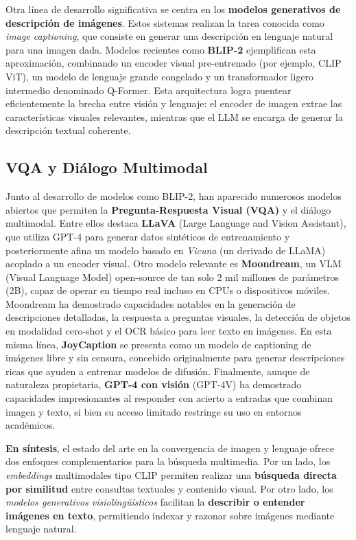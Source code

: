 Otra línea de desarrollo significativa se centra en los \textbf{modelos generativos de descripción de imágenes}. Estos sistemas realizan la tarea conocida como \emph{image captioning}, que consiste en generar una descripción en lenguaje natural para una imagen dada. Modelos recientes como \textbf{BLIP-2} ejemplifican esta aproximación, combinando un encoder visual pre-entrenado (por ejemplo, CLIP ViT), un modelo de lenguaje grande congelado y un transformador ligero intermedio denominado Q-Former. Esta arquitectura logra puentear eficientemente la brecha entre visión y lenguaje: el encoder de imagen extrae las características visuales relevantes, mientras que el LLM se encarga de generar la descripción textual coherente.

\subsection{VQA y Diálogo Multimodal}

Junto al desarrollo de modelos como BLIP-2, han aparecido numerosos modelos abiertos que permiten la \textbf{Pregunta-Respuesta Visual (VQA)} y el diálogo multimodal. Entre ellos destaca \textbf{LLaVA} (Large Language and Vision Assistant), que utiliza GPT-4 para generar datos sintéticos de entrenamiento y posteriormente afina un modelo basado en \emph{Vicuna} (un derivado de LLaMA) acoplado a un encoder visual. Otro modelo relevante es \textbf{Moondream}, un VLM (Visual Language Model) open-source de tan solo 2 mil millones de parámetros (2B), capaz de operar en tiempo real incluso en CPUs o dispositivos móviles. Moondream ha demostrado capacidades notables en la generación de descripciones detalladas, la respuesta a preguntas visuales, la detección de objetos en modalidad cero-shot y el OCR básico para leer texto en imágenes. En esta misma línea, \textbf{JoyCaption} se presenta como un modelo de captioning de imágenes libre y sin censura, concebido originalmente para generar descripciones ricas que ayuden a entrenar modelos de difusión. Finalmente, aunque de naturaleza propietaria, \textbf{GPT-4 con visión} (GPT-4V) ha demostrado capacidades impresionantes al responder con acierto a entradas que combinan imagen y texto, si bien su acceso limitado restringe su uso en entornos académicos.

\textbf{En síntesis}, el estado del arte en la convergencia de imagen y lenguaje ofrece dos enfoques complementarios para la búsqueda multimedia. Por un lado, los \emph{embeddings} multimodales tipo CLIP permiten realizar una \textbf{búsqueda directa por similitud} entre consultas textuales y contenido visual. Por otro lado, los \emph{modelos generativos visiolingüísticos} facilitan la \textbf{describir o entender imágenes en texto}, permitiendo indexar y razonar sobre imágenes mediante lenguaje natural.

